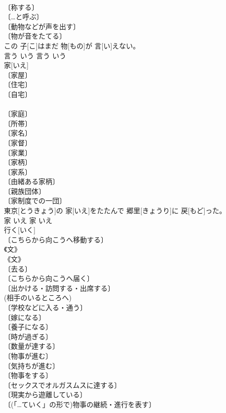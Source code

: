\documentclass[8pt]{extreport}
\begin{document}
\begin{CJK}{UTF8}{min}
\\	〔称する〕 
\\	〔…と呼ぶ〕 
\\	〔動物などが声を出す〕 
\\	〔物が音をたてる〕 
\\	この 子[こ]はまだ 物[もの]が 言[い]えない。	
\\	言う	いう	言う	いう	
\\	家[いえ]	
\\	〔家屋〕 
\\	〔住宅〕 
\\	〔自宅〕 
\\	[⇒うち２] 
\\	〔家庭〕 
\\	〔所帯〕 
\\	〔家名〕 
\\	〔家督〕 
\\	〔家業〕 
\\	〔家柄〕 
\\	〔家系〕 
\\	〔由緒ある家柄〕 
\\	〔親族団体〕 
\\	〔家制度での一団〕 
\\	東京[とうきょう]の 家[いえ]をたたんで 郷里[きょうり]に 戻[もど]った。	
\\	家	いえ	家	いえ	
\\	行く[いく]	
\\	〔こちらから向こうへ移動する〕 
\\	《文》 
\\	《文》 
\\	〔去る〕 
\\	〔こちらから向こうへ届く〕 
\\	〔出かける・訪問する・出席する〕 
\\	(相手のいるところへ) 
\\	〔学校などに入る・通う〕 
\\	〔嫁になる〕 
\\	〔養子になる〕 
\\	〔時が過ぎる〕 
\\	〔数量が達する〕 
\\	〔物事が進む〕 
\\	〔気持ちが進む〕 
\\	〔物事をする〕 
\\	〔セックスでオルガスムスに達する〕 
\\	〔現実から遊離している〕 
\\	〔(「…ていく」の形で)物事の継続・進行を表す〕 

\end{CJK}
\end{document}
